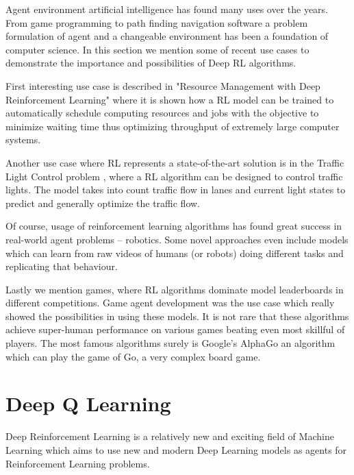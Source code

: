 \documentclass[b5paper]{book}
\let\cite\parencite
\begin{document}

Agent environment artificial intelligence has found many uses over the years. From game programming to path finding navigation software a problem formulation of agent and a changeable environment has been a foundation of computer science. In this section we mention some of recent use cases to demonstrate the importance and possibilities of Deep RL algorithms.

First interesting use case is described in "Resource Management with Deep Reinforcement Learning" \cite{mao2016resource} where it is shown how a RL model can be trained to automatically schedule computing resources and jobs with the objective to minimize waiting time thus optimizing throughput of extremely large computer systems.

Another use case where RL represents a state-of-the-art solution is in the Traffic Light Control problem \cite{wiering2000multi}, where a RL algorithm can be designed to control traffic lights. The model takes into count traffic flow in lanes and current light states to predict and generally optimize the traffic flow.

Of course, usage of reinforcement learning algorithms has found great success in real-world agent problems -- robotics. Some novel approaches even include models which can learn from raw videos of humans (or robots) doing different tasks and replicating that behaviour. \cite{mnih2015human}

Lastly we mention games, where RL algorithms dominate model leaderboards in different competitions. \cite{mnih2013playing} \cite{silver2016mastering} Game agent development was the use case which really showed the possibilities in using these models. It is not rare that these algorithms achieve super-human performance on various games beating even most skillful of players. The most famous algorithms surely is Google's AlphaGo an algorithm which can play the game of Go, a very complex board game.

\section{Deep Q Learning}



Deep Reinforcement Learning is a relatively new and exciting field of Machine Learning which aims to use new and modern Deep Learning models as agents for Reinforcement Learning problems.
\end{document}
